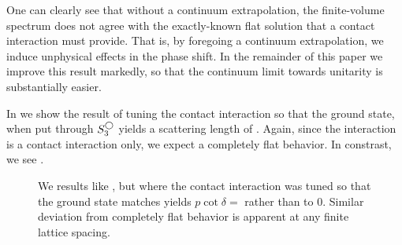 One can clearly see that without a continuum extrapolation, the finite-volume spectrum does not agree with the exactly-known flat solution that a contact interaction must provide.
That is, by foregoing a continuum extrapolation, we induce unphysical effects in the phase shift.
In the remainder of this paper we improve this result markedly, so that the continuum limit towards unitarity is substantially easier.


In  we show the result of tuning the contact interaction so that the ground state, when put through $S^{\bigcirc}_3$ yields a scattering length of .
Again, since the interaction is a contact interaction only, we expect a completely flat behavior.
In constrast, we see .

\begin{figure}[th]
    
    \caption{We results like , but where the contact interaction was tuned so that the ground state matches yields $p\cot\delta = $ rather than to 0.  Similar deviation from completely flat behavior is apparent at any finite lattice spacing.}
    \label{fig:finite a spherical}
\end{figure}


